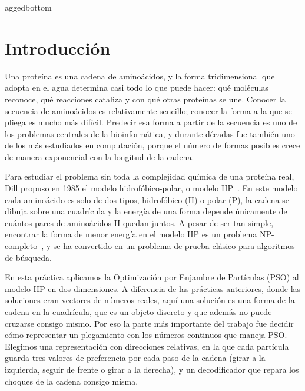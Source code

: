 \raggedbottom %
aggedbottom %
\setcounter{page}{1}

\section{Introducción}

Una proteína es una cadena de aminoácidos, y la forma tridimensional que adopta en el agua determina casi todo lo que puede hacer: qué moléculas reconoce, qué reacciones cataliza y con qué otras proteínas se une. Conocer la secuencia de aminoácidos es relativamente sencillo; conocer la forma a la que se pliega es mucho más difícil. Predecir esa forma a partir de la secuencia es uno de los problemas centrales de la bioinformática, y durante décadas fue también uno de los más estudiados en computación, porque el número de formas posibles crece de manera exponencial con la longitud de la cadena.

Para estudiar el problema sin toda la complejidad química de una proteína real, Dill propuso en 1985 el modelo hidrofóbico-polar, o modelo HP~\cite{dill1985theory, lau1989lattice}. En este modelo cada aminoácido es solo de dos tipos, hidrofóbico (H) o polar (P), la cadena se dibuja sobre una cuadrícula y la energía de una forma depende únicamente de cuántos pares de aminoácidos H quedan juntos. A pesar de ser tan simple, encontrar la forma de menor energía en el modelo HP es un problema NP-completo~\cite{crescenzi1998complexity, berger1998protein}, y se ha convertido en un problema de prueba clásico para algoritmos de búsqueda.

En esta práctica aplicamos la Optimización por Enjambre de Partículas (PSO) al modelo HP en dos dimensiones. A diferencia de las prácticas anteriores, donde las soluciones eran vectores de números reales, aquí una solución es una forma de la cadena en la cuadrícula, que es un objeto discreto y que además no puede cruzarse consigo mismo. Por eso la parte más importante del trabajo fue decidir cómo representar un plegamiento con los números continuos que maneja PSO. Elegimos una representación con direcciones relativas, en la que cada partícula guarda tres valores de preferencia por cada paso de la cadena (girar a la izquierda, seguir de frente o girar a la derecha), y un decodificador que repara los choques de la cadena consigo misma.

